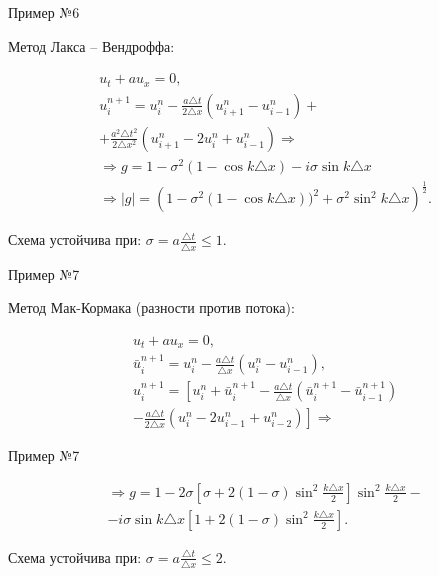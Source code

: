 \documentclass[10pt,xcolor=pst,aspectratio=169]{beamer}
\begin{document}
\begin{frame}{Пример №6}

	\transdissolve[duration=0.1]
	\justifying
	\large

	Метод Лакса -- Вендроффа:

	\[
		\begin{split}
			&u_{t} + a u_{x} = 0 , \\
			&u^{n + 1}_{i} = u^{n}_{i} - \frac{a \triangle t}{2 \triangle x} (u^{n}_{i + 1} - u^{n}_{i - 1}) + \\
			& + \frac{a^{2} \triangle t^{2}}{2 \triangle x^{2}} (u^{n}_{i + 1} - 2 u^{n}_{i} + u^{n}_{i - 1}) \Rightarrow \\
			& \Rightarrow g = 1 - \sigma^{2} (1 - \cos k \triangle x) - i \sigma \sin k \triangle x \\
			& \Rightarrow |g| = \left( 1 - \sigma^{2} (1 - \cos k \triangle x))^2 + \sigma^{2} \sin^{2} k \triangle x \right)^{\frac{1}{2}} .
		\end{split}
	\]

    Схема устойчива при: $\sigma = a \frac{\triangle t}{\triangle x} \leq 1$.\\

\end{frame}

\begin{frame}{Пример №7}

	\transdissolve[duration=0.1]
	\justifying
	\large

	Метод Мак-Кормака (разности против потока):

	\[
		\begin{split}
			&u_{t} + a u_{x} = 0 , \\
			&\bar{u}^{n + 1}_{i} = u^{n}_{i} - \frac{a \triangle t}{\triangle x} (u^{n}_{i} - u^{n}_{i - 1}) , \\
			&u^{n + 1}_{i} = \left[ u^{n}_{i} + \bar{u}^{n + 1}_{i} - \frac{a \triangle t}{\triangle x} (\bar{u}^{n + 1}_{i} - \bar{u}^{n + 1}_{i - 1}) \right. \\
			& \left. - \frac{a \triangle t}{2 \triangle x} (u^{n}_{i} - 2 u^{n}_{i - 1} + u^{n}_{i - 2}) \right] \Rightarrow
		\end{split}
	\]

\end{frame}

\begin{frame}{Пример №7}

	\transdissolve[duration=0.1]
	\justifying
	\large

	\[
		\begin{split}
			& \Rightarrow g = 1 - 2 \sigma \left[ \sigma + 2 (1 - \sigma) \sin^{2} \frac{k \triangle x}{2} \right] \sin^{2} \frac{k \triangle x}{2} - \\
			& - i \sigma \sin k \triangle x \left[ 1 + 2 (1 - \sigma) \sin^{2} \frac{k \triangle x}{2} \right] .
		\end{split}
	\]

    Схема устойчива при: $\sigma = a \frac{\triangle t}{\triangle x} \leq 2$.\\

\end{frame}
\end{document}
